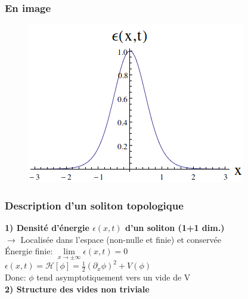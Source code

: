 \documentclass[handout]{beamer}
\begin{document}
	\begin{frame}\frametitle{En image}

	\begin{figure}[0.3\textwidth]
   \includegraphics[scale=0.5]{densite.png}
    \end{figure}
    \end{frame}

\begin{frame}\frametitle{Description d'un soliton topologique}

	\textbf{1) Densité d'énergie $\epsilon(x,t)$ d'un soliton (1+1 dim.)} 
	\\$\rightarrow$ Localisée dans l'espace (non-nulle et finie) et conservée\\[0.5 cm]
Énergie finie: $\lim\limits_{x \to \pm\infty}\epsilon(x,t) =0$\\[0.25 cm]
$\epsilon(x,t) =\mathcal{H}[\phi] = \frac{1}{2} (\partial_x \phi)^2 + V(\phi)$\\[0.25 cm]
Donc: $\phi$ tend asymptotiquement vers un vide de V\\[0.5 cm]
	\textbf{2) Structure des vides non triviale} 
		\end{frame}

	
\end{document}
